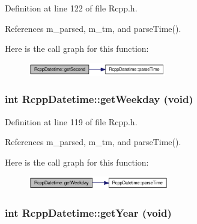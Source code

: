 Definition at line 122 of file Rcpp.h.

References m\_\-parsed, m\_\-tm, and parseTime().

Here is the call graph for this function:\nopagebreak
\begin{figure}[H]
\begin{center}
\leavevmode
\includegraphics[width=170pt]{classRcppDatetime_2feb900005890d183cc5f6a626c4d614_cgraph}
\end{center}
\end{figure}
\hypertarget{classRcppDatetime_796802561fa8bb87a8e2a1836afaaa58}{
\subsubsection[{getWeekday}]{\setlength{\rightskip}{0pt plus 5cm}int RcppDatetime::getWeekday (void)}}
\label{classRcppDatetime_796802561fa8bb87a8e2a1836afaaa58}




Definition at line 119 of file Rcpp.h.

References m\_\-parsed, m\_\-tm, and parseTime().

Here is the call graph for this function:\nopagebreak
\begin{figure}[H]
\begin{center}
\leavevmode
\includegraphics[width=174pt]{classRcppDatetime_796802561fa8bb87a8e2a1836afaaa58_cgraph}
\end{center}
\end{figure}
\hypertarget{classRcppDatetime_ba930a8d7d575eb10444258a442027cf}{
\subsubsection[{getYear}]{\setlength{\rightskip}{0pt plus 5cm}int RcppDatetime::getYear (void)}}
\label{classRcppDatetime_ba930a8d7d575eb10444258a442027cf}




